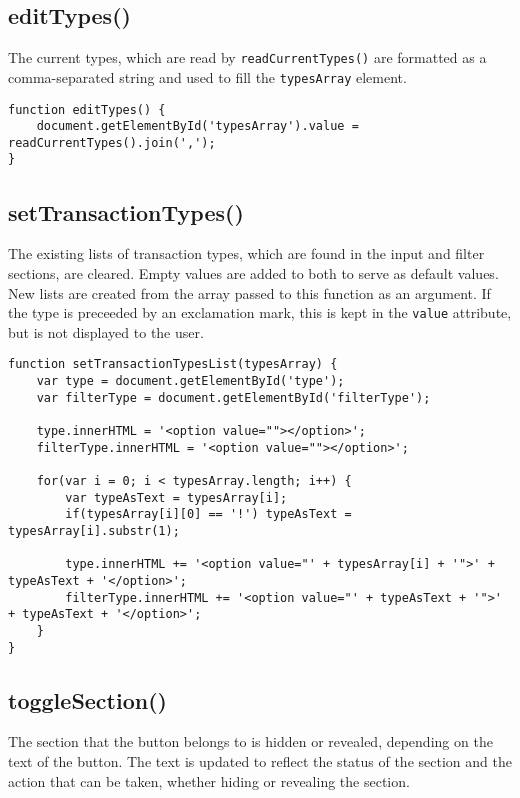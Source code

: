 \documentclass[letterpaper]{article}
\begin{document}
\subsection{editTypes()}

The current types, which are read by \lstinline{readCurrentTypes()} are formatted as a comma-separated string and used to fill the \lstinline{typesArray} element.

\begin{lstlisting}[firstnumber=673]
function editTypes() {
    document.getElementById('typesArray').value = readCurrentTypes().join(',');
}
\end{lstlisting}

\subsection{setTransactionTypes()}

The existing lists of transaction types, which are found in the input and filter sections, are cleared.
Empty values are added to both to serve as default values.
New lists are created from the array passed to this function as an argument.
If the type is preceeded by an exclamation mark, this is kept in the \lstinline{value} attribute, but is not displayed to the user.

\begin{lstlisting}[firstnumber=677]
function setTransactionTypesList(typesArray) {
    var type = document.getElementById('type');
    var filterType = document.getElementById('filterType');

    type.innerHTML = '<option value=""></option>';
    filterType.innerHTML = '<option value=""></option>';

    for(var i = 0; i < typesArray.length; i++) {
        var typeAsText = typesArray[i];
        if(typesArray[i][0] == '!') typeAsText = typesArray[i].substr(1);

        type.innerHTML += '<option value="' + typesArray[i] + '">' + typeAsText + '</option>';
        filterType.innerHTML += '<option value="' + typeAsText + '">' + typeAsText + '</option>';
    }
}
\end{lstlisting}

\subsection{toggleSection()}

The section that the button belongs to is hidden or revealed, depending on the text of the button.
The text is updated to reflect the status of the section and the action that can be taken, whether hiding or revealing the section.
\end{document}
